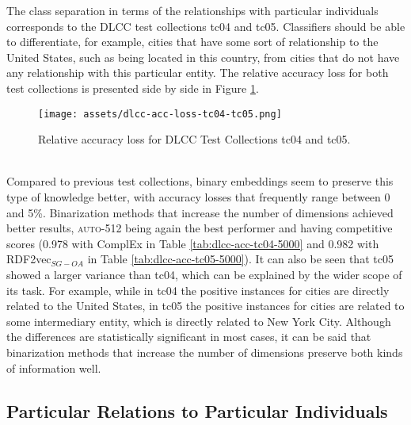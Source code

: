 \documentclass[11pt,titlepage,oneside,openany]{book}
\begin{document}
The class separation in terms of the relationships with particular individuals corresponds to the DLCC test collections tc04 and tc05. Classifiers should be able to differentiate, for example, cities that have some sort of relationship to the United States, such as being located in this country, from cities that do not have any relationship with this particular entity. The relative accuracy loss for both test collections is presented side by side in Figure \ref{fig:dlcc-acc-loss-tc04-tc05}.\\
\begin{figure}[h!]
    \centering
    \centerline{\texttt{[image: assets/dlcc-acc-loss-tc04-tc05.png]}}
    \vspace*{-3mm}
    \caption{Relative accuracy loss for DLCC Test Collections tc04 and tc05.}
    \label{fig:dlcc-acc-loss-tc04-tc05}
\end{figure}
\\
Compared to previous test collections, binary embeddings seem to preserve this type of knowledge better, with accuracy losses that frequently range between 0 and 5\%. Binarization methods that increase the number of dimensions achieved better results, \textsc{auto-512} being again the best performer and having competitive scores (0.978 with ComplEx in Table \ref{tab:dlcc-acc-tc04-5000} and 0.982 with RDF2vec$_{SG-OA}$ in Table \ref{tab:dlcc-acc-tc05-5000}). It can also be seen that tc05 showed a larger variance than tc04, which can be explained by the wider scope of its task. For example, while in tc04 the positive instances for cities are directly related to the United States, in tc05 the positive instances for cities are related to some intermediary entity, which is directly related to New York City. Although the differences are statistically significant in most cases, it can be said that binarization methods that increase the number of dimensions preserve both kinds of information well.

\subsection{Particular Relations to Particular Individuals}
\label{subsubsec:tc06}
\end{document}

